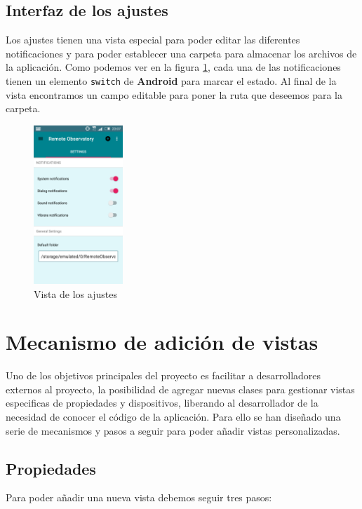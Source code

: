 \bigskip
\subsection{Interfaz de los ajustes}

Los ajustes tienen una vista especial para poder editar las diferentes notificaciones y para poder establecer una carpeta para almacenar los archivos de la aplicación. Como podemos ver en la figura \ref{fig:settings_view}, cada una de las notificaciones tienen un elemento \texttt{switch} de \textbf{Android} para marcar el estado. Al final de la vista encontramos un campo editable para poner la ruta que deseemos para la carpeta.


\begin{figure}[!ht]
  \begin{center}
  \includegraphics[width=0.3\textwidth]{../images/settings2.png}
  \caption{Vista de los ajustes}
  \label{fig:settings_view}
  \end{center}
\end{figure}


\bigskip
\section{Mecanismo de adición de vistas}

Uno de los objetivos principales del proyecto es facilitar a desarrolladores externos al proyecto, la posibilidad de agregar nuevas clases para gestionar vistas especificas de propiedades y dispositivos, liberando al desarrollador de la necesidad de conocer el código de la aplicación. Para ello se han diseñado una serie de mecanismos y pasos a seguir para poder añadir vistas personalizadas.


\bigskip
\subsection{Propiedades}
Para poder añadir una nueva vista debemos seguir tres pasos:

